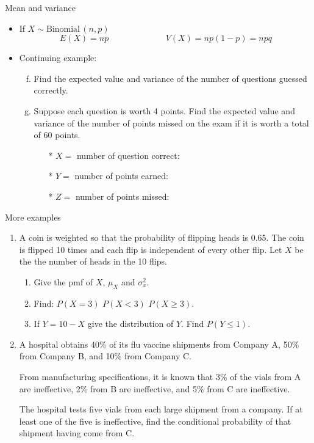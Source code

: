 \documentclass{article}
\newcommand{\follow}[1]{\sim \text{#1}\,}		%
\begin{document}
Mean and variance\bigskip
\begin{itemize}
    \item If $X \follow{Binomial}(n, p)$\smallskip
    \[E(X) = np \hspace{80pt} V(X) = np(1 - p) = npq\]
    \item Continuing example:
    \begin{enumerate}[(a)]\setcounter{enumi}{5}
        \item Find the expected value and variance of the number of questions guessed correctly.\vspace{60pt}
        \item Suppose each question is worth 4 points. Find the expected value and variance of the number of points missed on the exam if it is worth a total of 60 points.
        \begin{itemize}
            \item[*] $X = $ number of question correct:
            \item[*] $Y = $ number of points earned:
            \item[*] $Z = $ number of points missed:
        \end{itemize}\vspace{40pt}
    \end{enumerate}
\end{itemize}

\newpage

More examples\bigskip
\begin{enumerate}
    \item A coin is weighted so that the probability of flipping heads is 0.65. The coin is flipped 10 times and each flip is independent of every other flip. Let $X$ be the the number of heads in the 10 flips.
    \begin{enumerate}
        \item Give the pmf of $X$, $\mu_X$ and $\sigma_x^2$.\vspace{30pt}
        \item Find: $P(X = 3)$ \hfill $P(X < 3)$ \hfill $P(X \ge 3)$.\vspace{80pt}
        \item If $Y = 10 - X$ give the distribution of $Y$. Find $P(Y \le 1)$.\vspace{70pt}
    \end{enumerate}
    \item A hospital obtains 40\% of its flu vaccine shipments from Company A, 50\% from Company B, and 10\% from Company C.
    \item[] From manufacturing specifications, it is known that 3\% of the vials from A are ineffective, 2\% from B are ineffective, and 5\% from C are ineffective.
    \item[] The hospital tests five vials from each large shipment from a company. If at least one of the five is ineffective, find the conditional probability of that shipment having come from C.\vspace{200pt}
\end{enumerate}
\end{document}
